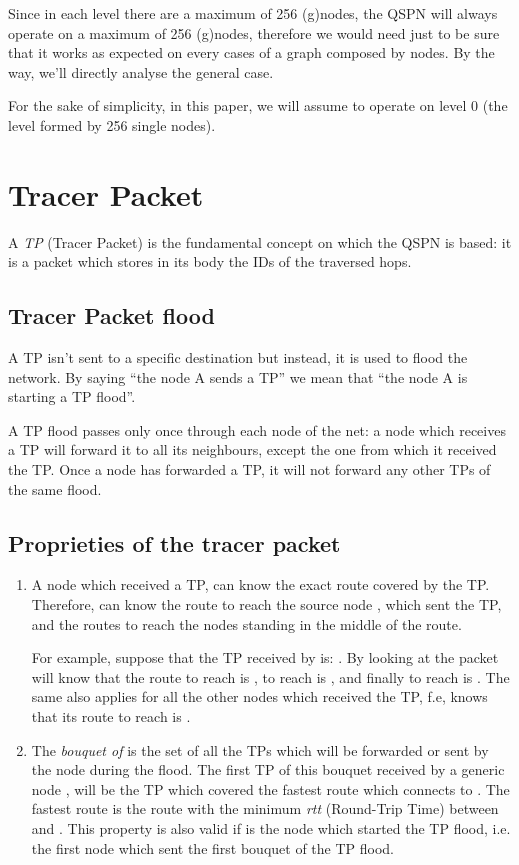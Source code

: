 \documentclass[a4paper]{article}
\begin{document}
Since in each level there are a maximum of 256 (g)nodes, the QSPN will
always operate on a maximum of 256 (g)nodes, therefore we would need just to
be sure that it works as expected on every cases of a graph composed by  nodes. By the way, we'll directly analyse the general case.

For the sake of simplicity, in this paper, we will assume to operate on level
0 (the level formed by 256 single nodes).

\section{Tracer Packet}
\label{sec:TP}

A \emph{TP} (Tracer Packet) is the fundamental concept on which the QSPN is
based: 
it is a packet which stores in its body the IDs of the traversed hops.

\subsection{Tracer Packet flood}
\label{sec:TP_flood}

A TP isn't sent to a specific destination but instead, it is used to flood the
network. By saying ``the node A sends a TP'' we mean that ``the node A is
starting a TP flood''.

A TP flood passes only once through each node of the net: a node which
receives a TP will forward it to all its neighbours, except the one from which
it received the TP. Once a node has forwarded a TP, it will not forward any
other TPs of the same flood.

\subsection{Proprieties of the tracer packet}
\label{sec:proprieties_TP}

\begin{enumerate}
	\item A node  which received a TP, can know the exact route covered
		by the TP. Therefore,  can know the route to reach the
		source node , which sent the TP, and the routes to reach
		the nodes standing in the middle of the route.
		
		For example, suppose that the TP received by  is: . By looking at the packet  will
		know that the route to reach  is , to reach  is
		, and finally to reach  is
		.
		The same also applies for all the other nodes which received
		the TP, f.e,  knows that its route to reach  is
		.
	\item The \emph{bouquet of } is the set of all the TPs which will
		be forwarded or sent by the node  during the flood.
		The first TP of this bouquet received by a generic node ,
		will be the TP which covered the fastest route which connects
		 to .
		The fastest  route is the route with the
		minimum \emph{rtt} (Round-Trip Time) between  and .
		This property is also valid if  is the node which started
		the TP flood, i.e. the first node which sent the first bouquet
		of the TP flood.
\end{enumerate}
\end{document}
